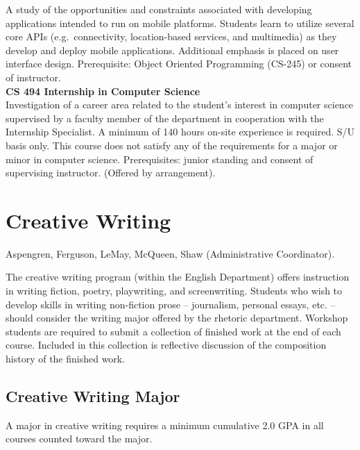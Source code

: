 \documentclass[
  letterpaper,
]{scrbook}
\begin{document}
A study of the opportunities and constraints associated with developing
applications intended to run on mobile platforms. Students learn to
utilize several core APIs (e.g.~connectivity, location-based services,
and multimedia) as they develop and deploy mobile applications.
Additional emphasis is placed on user interface design. Prerequisite:
Object Oriented Programming (CS-245) or consent of instructor.\\
\textbf{CS 494 Internship in Computer Science}\\
Investigation of a career area related to the student's interest in
computer science supervised by a faculty member of the department in
cooperation with the Internship Specialist. A minimum of 140 hours
on-site experience is required. S/U basis only. This course does not
satisfy any of the requirements for a major or minor in computer
science. Prerequisites: junior standing and consent of supervising
instructor. (Offered by arrangement).

\section{Creative Writing}\label{sec-creative-writing}

Aspengren, Ferguson, LeMay, McQueen, Shaw (Administrative Coordinator).

The creative writing program (within the English Department) offers
instruction in writing fiction, poetry, playwriting, and screenwriting.
Students who wish to develop skills in writing non-fiction prose --
journalism, personal essays, etc. -- should consider the writing major
offered by the rhetoric department. Workshop students are required to
submit a collection of finished work at the end of each course. Included
in this collection is reflective discussion of the composition history
of the finished work.

\subsection{Creative Writing Major}\label{creative-writing-major}

A major in creative writing requires a minimum cumulative 2.0 GPA in all
courses counted toward the major.
\end{document}
